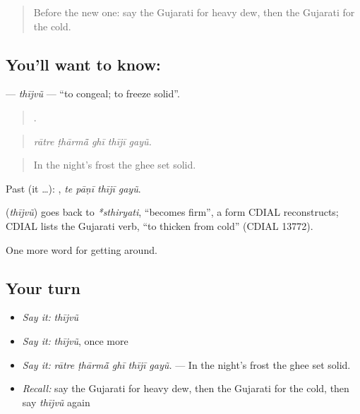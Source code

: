 \begin{quote}
Before the new one: say the Gujarati for heavy dew, then the Gujarati for the cold.
\end{quote}

\subsection*{You'll want to know: }
\textbf{} — \emph{thījvũ} — \textquotedblleft{}to congeal; to freeze solid\textquotedblright{}.

\begin{quote}
    .
\end{quote}

\begin{quote}
\emph{rātre ṭhārmā̃ ghī thījī gayũ.}
\end{quote}

\begin{quote}
In the night's frost the ghee set solid.
\end{quote}

Past (it …):    , \emph{te pāṇī thījī gayũ}.

\begin{cousinweb}
\textbf{} (\emph{thījvũ}) goes back to \emph{*sthiryati}, \textquotedblleft{}becomes firm\textquotedblright{}, a form CDIAL reconstructs; CDIAL lists the Gujarati verb, \textquotedblleft{}to thicken from cold\textquotedblright{} (CDIAL 13772).
\end{cousinweb}

\begin{grammarlens}[title={What you've built}]
One more word for getting around.
\end{grammarlens}

\subsection*{Your turn}
\begin{itemize}
\raggedright
  \item \emph{Say it:} \emph{thījvũ}
  \item \emph{Say it:} \emph{thījvũ}, once more
  \item \emph{Say it:} \emph{rātre ṭhārmā̃ ghī thījī gayũ.} — In the night's frost the ghee set solid.
  \item \emph{Recall:} say the Gujarati for heavy dew, then the Gujarati for the cold, then say \emph{thījvũ} again
\end{itemize}

